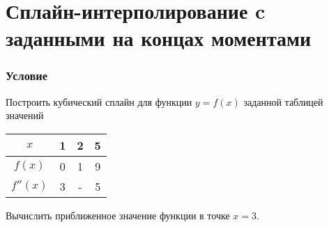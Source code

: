 \documentclass[a4paper, 12pt]{article}
\begin{document}
	\section*{Сплайн-интерполирование c заданными на концах моментами}
	\subsubsection*{Условие}
	Построить кубический сплайн для функции $y = f(x)$ заданной таблицей значений 
	\begin{center}\begin{tabular}[t]{|c|c|c|c|}
			\hline
			$x$ & 1 & 2 & 5 \\
			\hline
			$f(x)$ & 0 & 1 & 9 \\
			\hline
			$f''(x)$ & 3 & - & 5 \\
			\hline
	\end{tabular}\end{center}
	Вычислить приближенное значение функции в точке $x=3$.
\end{document}
